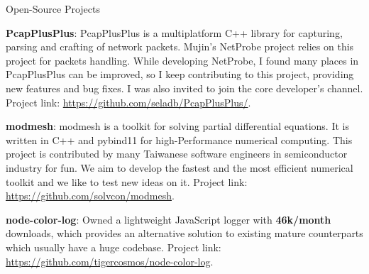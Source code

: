 
\vspace{-2mm}

\begin{cventries}

  \cventry
    {} %
    {Open-Source Projects} %
    {} %
    {} %
    {
      \vspace{-2mm}
      \begin{cvitems} %
        \item {\textbf{PcapPlusPlus}: PcapPlusPlus is a multiplatform C++ library for capturing, parsing and crafting of network packets.
          Mujin's NetProbe project relies on this project for packets handling. While developing NetProbe, I found many places in PcapPlusPlus can be improved,
          so I keep contributing to this project, providing new features and bug fixes. I was also invited to join the core developer's channel.
          Project link: \url{https://github.com/seladb/PcapPlusPlus/}.
        }
        \item {\textbf{modmesh}: modmesh is a toolkit for solving partial differential equations. It is written in C++ and pybind11 for high-Performance
        numerical computing. This project is contributed by many Taiwanese software engineers in semiconductor industry for fun. We aim to develop the 
        fastest and the most efficient numerical toolkit and we like to test new ideas on it. Project link: \url{https://github.com/solvcon/modmesh}.
        }
        \item {\textbf{node-color-log}: Owned a lightweight JavaScript logger with \textbf{46k/month} downloads,
          which provides an alternative solution to existing mature counterparts which usually have a huge codebase. Project link: \url{https://github.com/tigercosmos/node-color-log}.
        }
      \end{cvitems}
    }
  \vspace{-2mm}

\end{cventries}
